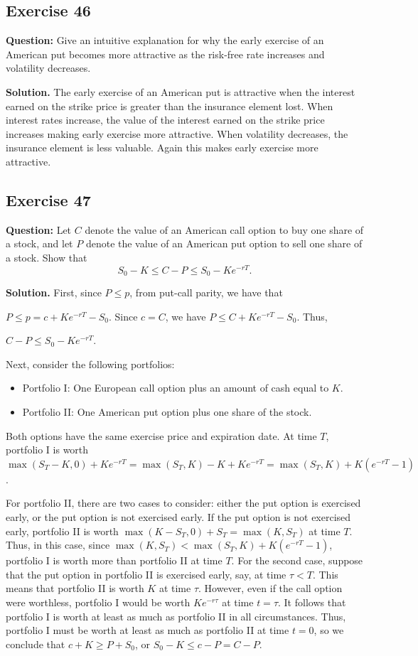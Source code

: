 \documentclass{article}
\begin{document}
\subsection*{Exercise 46}
\textbf{Question:} Give an intuitive explanation for why the early exercise of an American put becomes more attractive as the risk-free rate increases and volatility decreases.

\textbf{Solution.} The early exercise of an American put is attractive when the interest earned on the strike price is greater than the insurance element lost. When interest rates increase, the value of the interest earned on the strike price increases making early exercise more attractive. When volatility decreases, the insurance element is less valuable. Again this makes early exercise more attractive.

\subsection*{Exercise 47}
\textbf{Question:} Let $C$ denote the value of an American call option to buy one share of a stock, and let $P$ denote the value of an American put option to sell one share of a stock. Show that
\[
S_0 - K \leq C - P \leq S_0 - Ke^{-rT}.
\]

\textbf{Solution.} First, since $P \leq p$, from put-call parity, we have that 

$P \leq p = c + Ke^{-rT} - S_0$. Since $c = C$, we have $P \leq C + Ke^{-rT} - S_0$. Thus, 

$C - P \leq S_0 - Ke^{-rT}$.

Next, consider the following portfolios:
\begin{itemize}
    \item Portfolio I: One European call option plus an amount of cash equal to $K$.
    \item Portfolio II: One American put option plus one share of the stock.
\end{itemize}
Both options have the same exercise price and expiration date. At time $T$, portfolio I is worth $\max(S_T - K, 0) + Ke^{-rT} = \max(S_T, K) - K + Ke^{-rT} = \max(S_T, K) + K(e^{-rT} - 1)$.

For portfolio II, there are two cases to consider: either the put option is exercised early, or the put option is not exercised early. If the put option is not exercised early, portfolio II is worth $\max(K - S_T, 0) + S_T = \max(K, S_T)$ at time $T$. Thus, in this case, since $\max(K, S_T) < \max(S_T, K) + K(e^{-rT} - 1)$, portfolio I is worth more than portfolio II at time $T$. For the second case, suppose that the put option in portfolio II is exercised early, say, at time $\tau < T$. This means that portfolio II is worth $K$ at time $\tau$. However, even if the call option were worthless, portfolio I would be worth $Ke^{-r\tau}$ at time $t = \tau$. It follows that portfolio I is worth at least as much as portfolio II in all circumstances. Thus, portfolio I must be worth at least as much as portfolio II at time $t = 0$, so we conclude that $c + K \geq P + S_0$, or $S_0 - K \leq c - P = C - P$.
\end{document}
